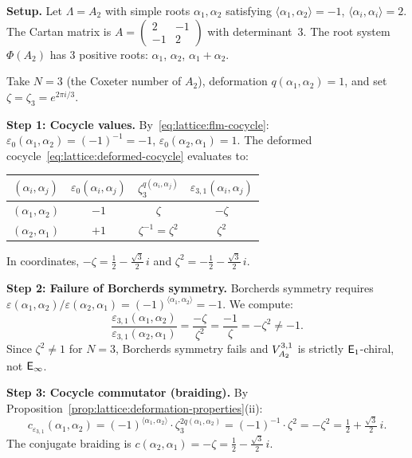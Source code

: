 \begin{computation}[\texorpdfstring{$A_2$}{A_2} at the Coxeter root: \texorpdfstring{$N = 3$}{N = 3}, \texorpdfstring{$q = 1$}{q = 1}]
\label{comp:lattice:a2-n3}

\noindent\textbf{Setup.}
Let $\Lambda = A_2$ with simple roots
$\alpha_1, \alpha_2$ satisfying
$\langle\alpha_1,\alpha_2\rangle = -1$, $\langle\alpha_i,\alpha_i\rangle = 2$.
The Cartan matrix is
$A = \left(\begin{smallmatrix}2 & -1\\-1 & 2\end{smallmatrix}\right)$
with determinant~$3$.
The root system $\Phi(A_2)$ has 3 positive roots:
$\alpha_1$, $\alpha_2$, $\alpha_1 + \alpha_2$.

Take $N = 3$ (the Coxeter number of $A_2$), deformation
$q(\alpha_1,\alpha_2) = 1$, and set $\zeta = \zeta_3 = e^{2\pi i/3}$.
\smallskip

\noindent\textbf{Step 1: Cocycle values.}
By~\eqref{eq:lattice:flm-cocycle}:
$\varepsilon_0(\alpha_1,\alpha_2) = (-1)^{-1} = -1$,
$\varepsilon_0(\alpha_2,\alpha_1) = 1$.
The deformed cocycle~\eqref{eq:lattice:deformed-cocycle}
evaluates to:
\begin{center}
\renewcommand{\arraystretch}{1.3}
\begin{tabular}{c c c c}
$(\alpha_i,\alpha_j)$
  & $\varepsilon_0(\alpha_i,\alpha_j)$
  & $\zeta_3^{q(\alpha_i,\alpha_j)}$
  & $\varepsilon_{3,1}(\alpha_i,\alpha_j)$ \\
\hline
$(\alpha_1,\alpha_2)$
  & $-1$ & $\zeta$ & $-\zeta$ \\
$(\alpha_2,\alpha_1)$
  & $+1$ & $\zeta^{-1} = \zeta^2$ & $\zeta^2$
\end{tabular}
\end{center}
In coordinates, $-\zeta = \tfrac{1}{2} - \tfrac{\sqrt{3}}{2}\,i$
and $\zeta^2 = -\tfrac{1}{2} - \tfrac{\sqrt{3}}{2}\,i$.
\smallskip

\noindent\textbf{Step 2: Failure of Borcherds symmetry.}
Borcherds symmetry requires
$\varepsilon(\alpha_1,\alpha_2)/\varepsilon(\alpha_2,\alpha_1)
= (-1)^{\langle\alpha_1,\alpha_2\rangle} = -1$.
We compute:
\[
\frac{\varepsilon_{3,1}(\alpha_1,\alpha_2)}%
     {\varepsilon_{3,1}(\alpha_2,\alpha_1)}
= \frac{-\zeta}{\zeta^2}
= \frac{-1}{\zeta}
= -\zeta^2
\neq -1.
\]
Since $\zeta^2 \neq 1$ for $N = 3$, Borcherds symmetry fails and
$V_{A_2}^{3,1}$ is strictly $\mathsf{E}_1$-chiral, not $\mathsf{E}_{\infty}$.
\smallskip

\noindent\textbf{Step 3: Cocycle commutator (braiding).}
By
Proposition~\ref{prop:lattice:deformation-properties}(ii):
\[
c_{\varepsilon_{3,1}}(\alpha_1,\alpha_2)
= (-1)^{\langle\alpha_1,\alpha_2\rangle} \cdot \zeta_3^{2q(\alpha_1,\alpha_2)}
= (-1)^{-1} \cdot \zeta^2
= -\zeta^2
= \tfrac{1}{2} + \tfrac{\sqrt{3}}{2}\,i.
\]
The conjugate braiding is
$c(\alpha_2,\alpha_1) = -\zeta = \tfrac{1}{2} - \tfrac{\sqrt{3}}{2}\,i$.
\smallskip


\end{computation}
